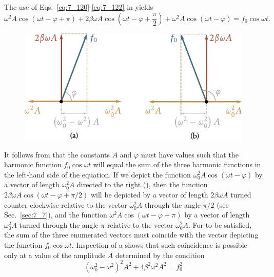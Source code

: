 \noindent
The use of Eqs.~\eqref{eq:7_120}-\eqref{eq:7_122} in  yields
\begin{equation}\label{eq:7_123}
	\omega^2 A\cos(\omega t - \varphi + \pi) + 2\beta\omega A \cos\left(\omega t - \varphi + \frac{\pi}{2}\right) +
	\omega^2 A\cos(\omega t - \varphi) = f_0\cos\omega t.
\end{equation}

\begin{figure}[t]
	\begin{center}
		\includegraphics[scale=0.95]{figures/ch_07/fig_7_22.pdf}
		\caption[]{}
		\label{fig:7_22}
	\end{center}
	\vspace{-0.8cm}
\end{figure}

It follows from  that the constants $A$ and $\varphi$ must have values such that the harmonic function $f_0\cos\omega t$ will equal the sum of the three harmonic functions in the left-hand side of the equation. If we depict the function $\omega_0^2A\cos(\omega t-\varphi)$ by a vector of length $\omega_0^2A$ directed to the right (), then the function $2\beta\omega A\cos(\omega t-\varphi+\pi/2)$ will be depicted by a vector of length $2\beta\omega A$ turned counter-clockwise relative to the vector $\omega_0^2A$ through the angle $\pi/2$ (see Sec.~\ref{sec:7_7}), and the function $\omega^2A\cos(\omega t-\varphi+\pi)$ by a vector of length $\omega_0^2A$ turned through the angle $\pi$ relative to the vector $\omega_0^2A$. For  to be satisfied, the sum of the three enumerated vectors must coincide with the vector depicting the function $f_0\cos\omega t$. Inspection of a shows that such coincidence is possible only at a value of the amplitude $A$ determined by the condition
\begin{equation*}
	\left(\omega_0^2 - \omega^2\right)^2A^2 + 4\beta^2\omega^2A^2 = f_0^2
\end{equation*}

